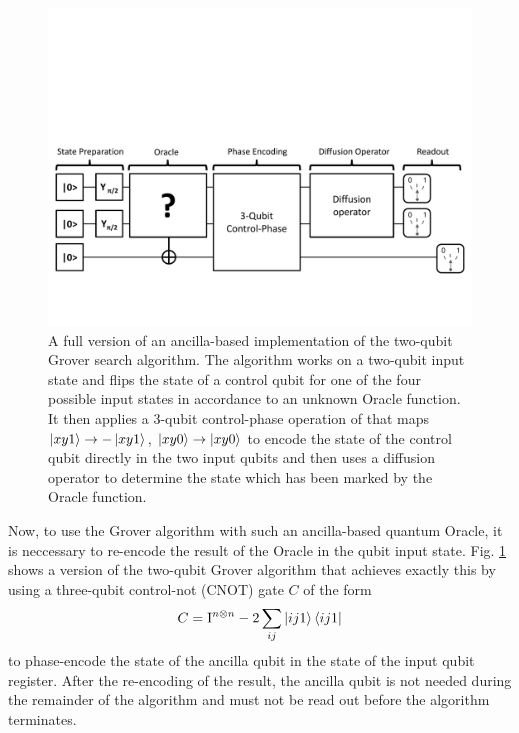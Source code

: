 \begin{figure}[ht!]
	\centering
		\includegraphics[width=1\textwidth]{./material/papers/grover/quantum_algorithm_full}
	\caption[Full version of an ancilla-based implementation of the two-qubit Grover search algorithm]{A full version of an ancilla-based implementation of the two-qubit Grover search algorithm. The algorithm works on a two-qubit input state and flips the state of a control qubit for one of the four possible input states in accordance to an unknown Oracle function. It then applies a 3-qubit control-phase operation of that maps $\left| xy1 \right>\to -\left| xy1 \right>$, $\left| xy0 \right>\to\left| xy0 \right>$ to encode the state of the control qubit directly in the two input qubits and then uses a diffusion operator to determine the state which has been marked by the Oracle function.}
	\label{fig:GroverAlgorithmFullSchematic}
\end{figure}

\smallskip

Now, to use the Grover algorithm with such an ancilla-based quantum Oracle, it is neccessary to re-encode the result of the Oracle in the qubit input state. Fig. \ref{fig:GroverAlgorithmFullSchematic} shows a version of the two-qubit Grover algorithm that achieves exactly this by using a three-qubit control-not (CNOT) gate $C$ of the form
%
\begin{equation}
C = \mathrm{I}^{n\otimes n}-2\sum\limits_{ij} \left| ij1 \right>\left< ij1 \right|
\end{equation}
%
to phase-encode the state of the ancilla qubit in the state of the input qubit register. After the re-encoding of the result, the ancilla qubit is not needed during the remainder of the algorithm and must not be read out before the algorithm terminates.

